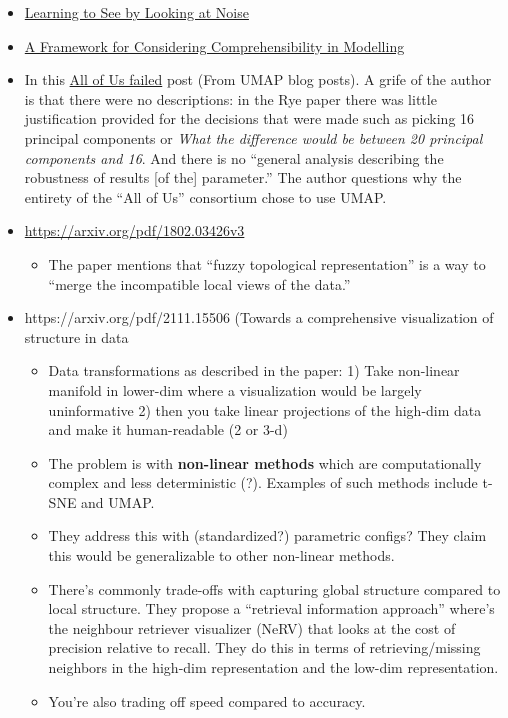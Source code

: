 \documentclass[
]{article}
\providecommand{\tightlist}{%
  \setlength{\itemsep}{0pt}\setlength{\parskip}{0pt}}\usepackage{longtable,booktabs,array}
\begin{document}
\begin{itemize}
\item
  \href{https://mbaradad.github.io/learning_with_noise/}{Learning to See
  by Looking at Noise}
\item
  \href{https://graphics.cs.wisc.edu/Papers/2016/Gle16/compjournal.pdf}{A
  Framework for Considering Comprehensibility in Modelling}
\item
  In this
  \href{https://liorpachter.wordpress.com/2024/02/26/all-of-us-failed/}{All
  of Us failed} post (From UMAP blog posts). A grife of the author is
  that there were no descriptions: in the Rye paper there was little
  justification provided for the decisions that were made such as
  picking 16 principal components or \emph{What the difference would be
  between 20 principal components and 16}. And there is no ``general
  analysis describing the robustness of results {[}of the{]}
  parameter.'' The author questions why the entirety of the ``All of
  Us'' consortium chose to use UMAP.
\item
  \href{UMAP\%20paper}{https://arxiv.org/pdf/1802.03426v3}

  \begin{itemize}
  \tightlist
  \item
    The paper mentions that ``fuzzy topological representation'' is a
    way to ``merge the incompatible local views of the data.''
  \end{itemize}
\item
  https://arxiv.org/pdf/2111.15506 (Towards a comprehensive
  visualization of structure in data

  \begin{itemize}
  \item
    Data transformations as described in the paper: 1) Take non-linear
    manifold in lower-dim where a visualization would be largely
    uninformative 2) then you take linear projections of the high-dim
    data and make it human-readable (2 or 3-d)
  \item
    The problem is with \textbf{non-linear methods} which are
    computationally complex and less deterministic (?). Examples of such
    methods include t-SNE and UMAP.
  \item
    They address this with (standardized?) parametric configs? They
    claim this would be generalizable to other non-linear methods.
  \item
    There's commonly trade-offs with capturing global structure compared
    to local structure. They propose a ``retrieval information
    approach'' where's the neighbour retriever visualizer (NeRV) that
    looks at the cost of precision relative to recall. They do this in
    terms of retrieving/missing neighbors in the high-dim representation
    and the low-dim representation.
  \item
    You're also trading off speed compared to accuracy.


\end{itemize}
\end{itemize}
\end{document}

